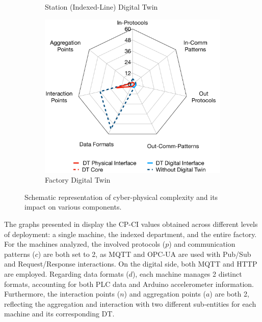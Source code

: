 \begin{figure}
\begin{subfigure}[t]{0.32\linewidth}
      \caption{Station (Indexed-Line) Digital Twin}
      \label{fig:station_complexity_index}
  \end{subfigure}
  \begin{subfigure}[t]{0.32\linewidth}
      \centering
      \includegraphics[width=\linewidth]{figures/dt-interoperability/factory_complexity_index.pdf}
      \caption{Factory Digital Twin}
      \label{fig:factory_complexity_index}
  \end{subfigure}
  \caption{Schematic representation of cyber-physical complexity and its impact on various components.}
  \label{fig:dt_complexity_index}
\end{figure}


The graphs presented in  display the CP-CI values obtained across different levels of deployment: a single machine, the indexed department, and the entire factory.
%
For the machines analyzed, the involved protocols ($p$) and communication patterns ($c$) are both set to 2, as MQTT and OPC-UA are used with Pub/Sub and Request/Response interactions.
On the digital side, both MQTT and HTTP are employed.
Regarding data formats ($d$), each machine manages 2 distinct formats, accounting for both PLC data and Arduino accelerometer information.
Furthermore, the interaction points ($n$) and aggregation points ($a$) are both 2, reflecting the aggregation and interaction with two different sub-entities for each machine and its corresponding DT.

